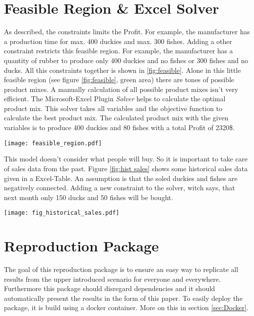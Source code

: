 \documentclass{article}
\begin{document}
\begin{multicols}{2}
\section{Feasible Region \& Excel Solver}
As described, the constraints limits the Profit. For example, the manufacturer has a production time for max. 400 duckies and max. 300 fishes. Adding a other constraint restricts this feasible region. For example, the manufacturer has a quantity of rubber to produce only 400 duckies and no fishes or 300 fishes and no ducks. All this constraints together is shown in \ref{fig:feasible}. Alone in this little feasible region (see figure \ref{fig:feasible}, green area) there are tones of possible product mixes. A manually calculation of all possible product mixes isn't very efficient. The Microsoft-Excel Plugin \textit{Solver} \cite{microsoft} helps to calculate the optimal product mix. This solver takes all variables and the objective function to calculate the best product mix. The calculated product mix with the given variables is to produce 400 duckies and 80 fishes with a total Profit of 2320\$.

\begin{center}
\texttt{[image: feasible\_region.pdf]}
\label{fig:feasible}
\end{center}

This model doesn't consider what people will buy. So it is important to take care of sales data from the past. Figure \ref{fig:hist sales} shows some historical sales data given in a Excel-Table. An assumption is that the soled duckies and fishes are negatively connected. Adding a new constraint to the solver, witch says, that next month only 150 ducks and 50 fishes will be bought.

\begin{center}
\texttt{[image: fig\_historical\_sales.pdf]}
\label{fig:hist sales}
\end{center}

\section{Reproduction Package}
The goal of this reproduction package is to ensure an easy way to replicate all results from the upper introduced scenario for everyone and everywhere. Furthermore this package should disregard dependencies and it should automatically present the results in the form of this paper. To easily deploy the package, it is build using a docker container. More on this in section \ref{sec:Docker}.



\end{multicols}
\end{document}
